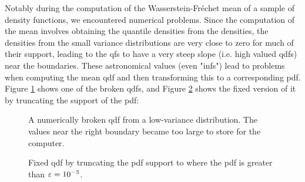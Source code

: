 Notably during the computation of the Wasserstein-Fréchet mean of a sample of density
functions, we encountered numerical problems. Since the computation of the mean involves
obtaining the quantile densities from the densities, the densities from the small
variance distributions are very close to zero for much of their support, leading to the
qfs to have a very steep slope (i.e. high valued qdfs) near the boundaries. These
astronomical values (even "infs") lead to problems when computing the mean qdf and then
transforming this to a corresponding pdf. 
Figure \ref{fig:broken_qdf} shows one of the broken qdfs, and Figure \ref{fig:fixed_qdf}
shows the fixed version of it by truncating the support of the pdf:

\begin{figure}[h]
    \centering
    \resizebox{0.9\textwidth}{!}{}
    \caption[Example of broken qdf]{A numerically broken qdf from a low-variance distribution.
    The values near the right boundary became too large to store for the computer.}
    \label{fig:broken_qdf}
\end{figure}

\begin{figure}[h]
    \centering
    \resizebox{0.9\textwidth}{!}{}
    \caption[Example of fixed qdf]{Fixed qdf by truncating the pdf support to where
    the pdf is greater than $\varepsilon = \nobreak 10^{-3}$.}
    \label{fig:fixed_qdf}
\end{figure}